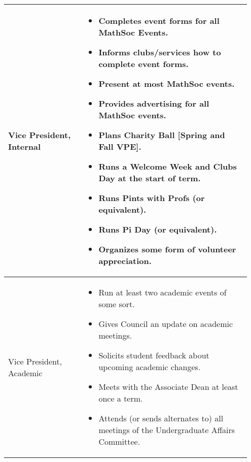 \begin{longtable}{p{0.3\linewidth} p{0.65\linewidth}}
\midrule
Vice President, Internal & 
\begin{itemize}
\item Completes event forms for all MathSoc Events.
\item Informs clubs/services how to complete event forms.
\item Present at most MathSoc events.
\item Provides advertising for all MathSoc events.
\item Plans Charity Ball [Spring and Fall VPE].
\item Runs a Welcome Week and Clubs Day at the start of term.
\item Runs Pints with Profs (or equivalent).
\item Runs Pi Day (or equivalent).
\item Organizes some form of volunteer appreciation.
\end{itemize}
\\
\midrule
Vice President, Academic &
\begin{itemize}
\item Run at least two academic events of some sort.
\item Gives Council an update on academic meetings.
\item Solicits student feedback about upcoming academic changes.
\item Meets with the Associate Dean at least once a term.
\item Attends (or sends alternates to) all meetings of the Undergraduate Affairs Committee.
\end{itemize}
\\
\bottomrule
\end{longtable}